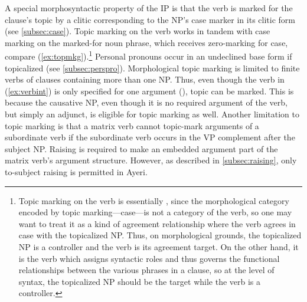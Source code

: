 A special morphosyntactic property of the IP is that the verb is marked for the
clause's topic by a clitic corresponding to the NP's case marker in its clitic
form (see \autoref{subsec:case}). Topic marking on the verb works in tandem
with case marking on the marked-for noun phrase, which receives zero-marking
for case, compare (\ref{ex:topmkg}).\footnote{Topic marking on the verb is
essentially , since the
morphological category encoded by topic marking---case---is not a category of
the verb, so one may want to treat it as a kind of agreement relationship where
the verb agrees in case with the topicalized NP. Thus, on morphological
grounds, the topicalized NP is a controller and the verb is its agreement
target. On the other hand, it is the verb which assigns syntactic roles and
thus governs the functional relationships between the various phrases in a
clause, so at the level of syntax, the topicalized NP should be the target
while the verb is a controller.} Personal pronouns occur in an undeclined base
form if topicalized (see \autoref{subsec:perspro}). Morphological topic marking
is limited to finite verbs of clauses containing more than one NP. Thus, even
though the verb in (\ref{ex:verbint}) is only specified for one argument
(\Aarg{}), topic can be marked. This is because the causative NP, even though
it is no required argument of the verb, but simply an adjunct, is eligible for
topic marking as well. Another limitation to topic marking is that a matrix
verb cannot topic-mark arguments of a subordinate verb if the subordinate verb
occurs in the VP complement after the subject NP. Raising is required to make
an embedded argument part of the matrix verb's argument structure. However, as
described in \autoref{subsec:raising}, only to-subject raising is permitted in
Ayeri.

